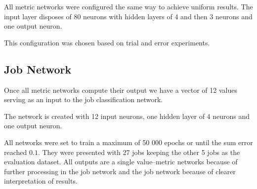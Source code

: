 All metric networks were configured the same way to achieve uniform results. The input layer disposes of 80 neurons with hidden layers of 4 and then 3 neurons and one output neuron.

This configuration was chosen based on trial and error experiments.

\subsection{Job Network}
Once all metric networks compute their output we have a vector of 12 values serving as an input to the job classification network.

The network is created with 12 input neurons, one hidden layer of 4 neurons and one output neuron.

All networks were set to train a maximum of 50 000 epochs or until the sum error reached $0.1$. They were presented with 27 jobs keeping the other 5 jobs as the evaluation dataset. All outputs are a single value--metric networks because of further processing in the job network and the job network because of clearer interpretation of results.
